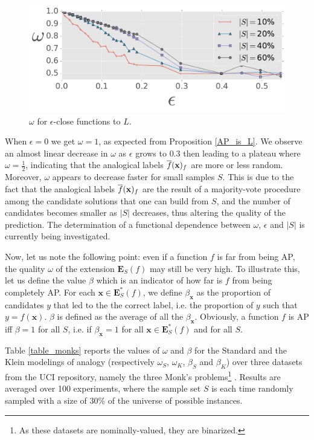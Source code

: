 \begin{figure}
\begin{center}
\includegraphics[scale=0.6]{figures/omega_vs_eps_dim8_nexp50_std_nEss8.pdf}
  \caption{$\omega$ for $\epsilon$-close functions to $L$.}
\label{omega_vs_eps}
\end{center}
\end{figure}

When $\epsilon = 0$ we get $\omega = 1$, as expected from
Proposition \ref{AP_is_L}. We observe an almost linear decrease in $\omega$ as
$\epsilon$ grows to $0.3$ then leading to a plateau where $\omega =
\frac{1}{2}$, indicating that the analogical labels $\overline{f}(\mathbf{x})_f$ are
more or less random. Moreover, $\omega$ appears to decrease faster for small
samples $S$. This is due to the fact that the analogical labels
$\overline{f}(\mathbf{x})_f$ are the result of a majority-vote procedure among the
candidate solutions that one can build from $S$, and the number of candidates
becomes smaller as $|S|$ decreases, thus altering the quality of the
prediction. The determination of a functional dependence between $\omega$,
$\epsilon$ and $|S|$ is currently being investigated.

Now, let us note the following point: even if a function $f$ is far from being
AP, the quality $\omega$ of the extension $\mathbf{E}_S(f)$ may still be very
high. To illustrate this, let us define the value $\beta$ which is an indicator
of how far is $f$ from being completely AP.  For each $\mathbf{x} \in
\mathbf{E}^*_S(f)$, we define $\beta_\mathbf{x}$ as the proportion of
candidates $y$ that led to the the correct label, i.e. the proportion of $y$
such that $y = f(\mathbf{x})$. $\beta$ is defined as the average of all the
$\beta_\mathbf{x}$.  Obviously, a function $f$ is AP iff $\beta = 1$ for all
$S$, i.e. if $\beta_\mathbf{x} = 1$ for all $\mathbf{x} \in \mathbf{E}^*_S(f)$
and for all $S$.

Table \ref{table_monks} reports the values of $\omega$ and $\beta$ for the
Standard and the Klein modelings of analogy (respectively $\omega_S$,
$\omega_K$, $\beta_S$ and $\beta_K$) over three datasets from the UCI
repository, namely the three Monk's problems\footnote{As these datasets are
nominally-valued, they are binarized.} \cite{UCIrepo}. Results are averaged
over 100 experiments, where the sample set $S$ is each time randomly sampled
with a size of $30$\% of the universe of possible instances.

